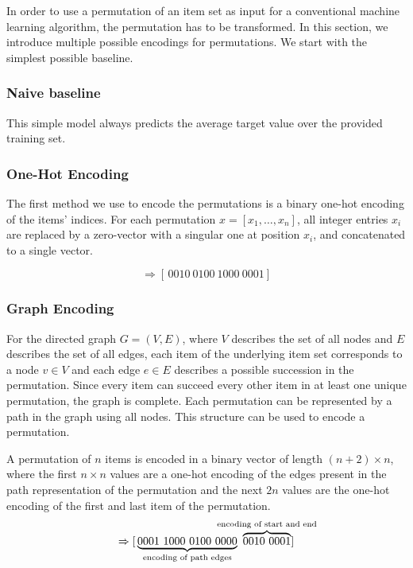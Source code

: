 In order to use a permutation of an item set as input for a conventional machine learning algorithm, the permutation has to be transformed. In this section, we introduce multiple possible encodings for permutations. We start with the simplest possible baseline.

\subsubsection{Naive baseline}

This simple model always predicts the average target value over the provided training set.




\subsubsection{One-Hot Encoding}

The first method we use to encode the permutations is a binary one-hot encoding of the items' indices. For each permutation $x = \left[x_1, \dots, x_n\right]$, all integer entries $x_i$ are replaced by a zero-vector with a singular one at position $x_i$, and concatenated to a single vector.

\begin{equation*}
 [ \, 3, 2, 1, 4] \, \Rightarrow [ \,0010\ 0100\ 1000\ 0001] \,
\end{equation*}


\subsubsection{Graph Encoding}

For the directed graph $G = (V,E)$, where $V$ describes the set of all nodes and $E$ describes the set of all edges, each item of the underlying item set corresponds to a node $v \in V$ and each edge $e \in E$ describes a possible succession in the permutation. Since every item can succeed every other item in at least one unique permutation, the graph is complete. Each permutation can be represented by a path in the graph using all nodes. This structure can be used to encode a permutation.



A permutation of $n$ items is encoded in a binary vector of length $(n + 2) \times n$, where the first $n\times n$ values are a one-hot encoding of the edges present in the path representation of the permutation and the next $2n$ values are the one-hot encoding of the first and last item of the permutation.
\begin{equation*}
 [ \, 3, 2, 1, 4] \, \Rightarrow [ \, \underbrace{0001\ 1000\ 0100\ 0000}_{\text{\makebox[0pt][c]{encoding of path edges}}}\ \overbrace{0010\ 0001}^{\text{\makebox[0pt][c]{encoding of start and end}}}] \,
\end{equation*}

